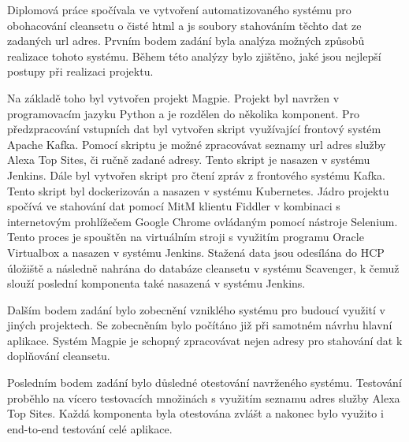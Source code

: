 \documentclass[thesis=M,czech,hidelinks]{FITthesis}[2013/05/06]
\begin{document}
\begin{conclusion}

Diplomová práce spočívala ve vytvoření automatizovaného systému pro obohacování cleansetu o čisté html a js soubory stahováním těchto dat ze zadaných url adres. Prvním bodem zadání byla analýza možných způsobů realizace tohoto systému. Během této analýzy bylo zjištěno, jaké jsou nejlepší postupy při realizaci projektu. 

Na základě toho byl vytvořen projekt Magpie. Projekt byl navržen v programovacím jazyku Python a je rozdělen do několika komponent. Pro předzpracování vstupních dat byl vytvořen skript využívající frontový systém Apache Kafka. Pomocí skriptu je možné zpracovávat seznamy url adres služby Alexa Top Sites, či ručně zadané adresy. Tento skript je nasazen v systému Jenkins. Dále byl vytvořen skript pro čtení zpráv z frontového systému Kafka. Tento skript byl dockerizován a nasazen v systému Kubernetes. Jádro projektu spočívá ve stahování dat pomocí MitM klientu Fiddler v kombinaci s internetovým prohlížečem Google Chrome ovládaným pomocí nástroje Selenium. Tento proces je spouštěn na virtuálním stroji s využitím programu Oracle Virtualbox a nasazen v systému Jenkins. Stažená data jsou odesílána do HCP úložiště a následně nahrána do databáze cleansetu v systému Scavenger, k čemuž slouží poslední komponenta také nasazená v systému Jenkins.

Dalším bodem zadání bylo zobecnění vzniklého systému pro budoucí využití v jiných projektech. Se zobecněním bylo počítáno již při samotném návrhu hlavní aplikace. Systém Magpie je schopný zpracovávat nejen adresy pro stahování dat k doplňování cleansetu.

Posledním bodem zadání bylo důsledné otestování navrženého systému. Testování proběhlo na vícero testovacích množinách s využitím seznamu adres služby Alexa Top Sites. Každá komponenta byla otestována zvlášt a nakonec bylo využito i end-to-end testování celé aplikace.







\end{conclusion}
\end{document}
